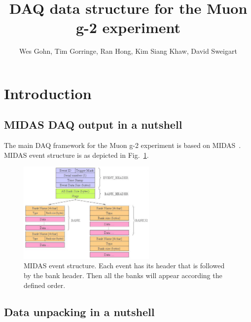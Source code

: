 

\author{Wes Gohn, Tim Gorringe, Ran Hong, Kim Siang Khaw, David Sweigart}
\title{\textbf{DAQ data structure for the Muon g-2 experiment}}


\maketitle


\tableofcontents
\newpage

\section{Introduction}

\subsection{MIDAS DAQ output in a nutshell}
The main DAQ framework for the Muon g-2 experiment is based on MIDAS~\cite{Midas}. 
MIDAS event structure is as depicted in Fig.~\ref{fig:MIDASEventStructure}.

\begin{figure}[htbp]
\centering
\includegraphics[width=0.6\textwidth]{pics/MIDASEventStructure.pdf} 
\caption{MIDAS event structure. Each event has its header that is followed by the bank header. Then all the banks will appear according the defined order.}\label{fig:MIDASEventStructure}
\end{figure}

\subsection{Data unpacking in a nutshell}

